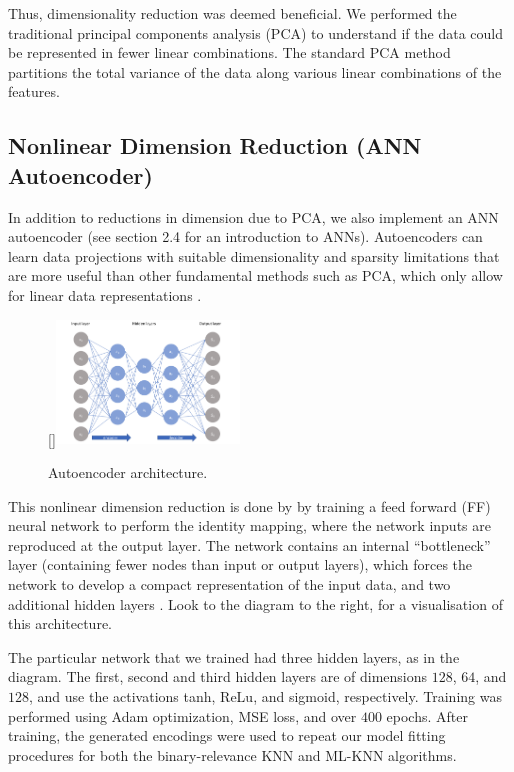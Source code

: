 \documentclass[11pt]{article}
\begin{document}
Thus, dimensionality reduction was deemed beneficial. We performed the traditional principal components analysis (PCA) to understand if the data could be represented in fewer linear combinations. The standard PCA method partitions the total variance of the data along various linear combinations of the features. 

\subsection{Nonlinear Dimension Reduction (ANN Autoencoder)}

In addition to reductions in dimension due to PCA, we also implement an ANN autoencoder (see section 2.4 for an introduction to ANNs). Autoencoders can learn data projections with suitable dimensionality and sparsity limitations that are more useful than other fundamental methods such as PCA, which only allow for linear data representations \autocite{Alkhayrat}.

\begin{figure}
    \begin{center}
        \raisebox{0pt}[\dimexpr{}\baselineskip\relax]{\includegraphics[width=0.435\textwidth]{autoencoder_diagram.png}}
        \caption{Autoencoder architecture.}
    \end{center}
\end{figure}

This nonlinear dimension reduction is done by by training a feed forward (FF) neural network to perform the identity mapping, where the network inputs are reproduced at the output layer. The network contains an internal “bottleneck” layer (containing fewer nodes than input or output layers), which forces the network to develop a compact representation of the input data, and two additional hidden layers \autocite{Kramer}. Look to the diagram to the right, for a visualisation of this architecture. 

The particular network that we trained had three hidden layers, as in the diagram. The first, second and third hidden layers are of dimensions $128$, $64$, and $128$, and use the activations tanh, ReLu, and sigmoid, respectively. Training was performed using Adam optimization, MSE loss, and over $400$ epochs. After training, the generated encodings were used to repeat our model fitting procedures for both the binary-relevance KNN and ML-KNN algorithms. 
\end{document}
